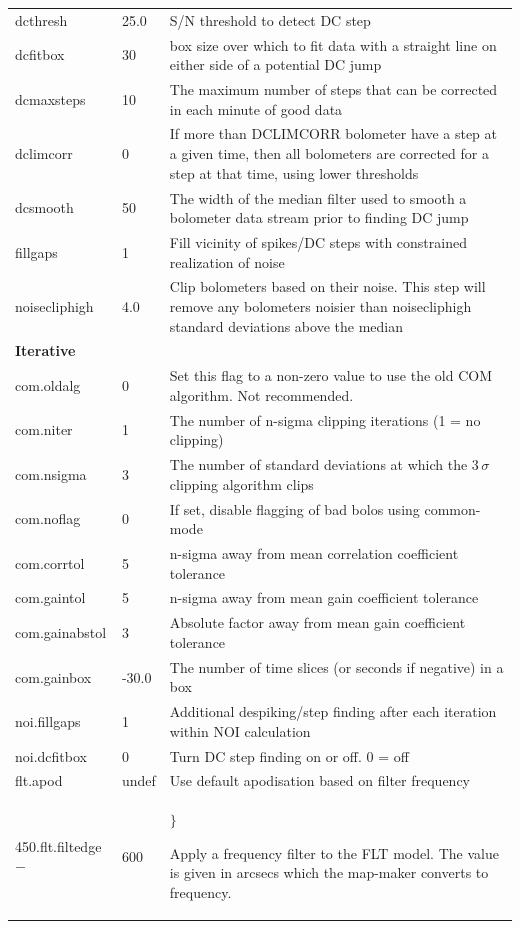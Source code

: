 \documentclass[twoside,11pt]{article}
\newcounter{box}
\renewcommand{\_}{\texttt{\symbol{95}}}
\begin{document}
\begin{table}
\begin{center}
\begin{footnotesize}
\begin{tabular}{|p{2.2cm}|p{1.1cm}|p{11.4cm}|}
dcthresh & 25.0& S/N threshold to detect DC step\\
dcfitbox & 30& box size over which to fit data with a straight line on either side of a potential DC jump\\
dcmaxsteps & 10 &The maximum number of steps that can be corrected in each minute of good data\\
dclimcorr & 0&  If more than DCLIMCORR bolometer have a step at a given time, then all  bolometers are corrected for a step at that time, using lower thresholds\\
dcsmooth & 50& The width of the median filter used to smooth a bolometer data stream prior to finding DC jump\\
fillgaps & 1& Fill vicinity of spikes/DC steps with constrained realization of noise\\
noisecliphigh &4.0& Clip bolometers based on their noise. This step will remove any bolometers noisier than noisecliphigh standard deviations above the median\\
\hline
\multicolumn{3}{|l|}{\textbf{Iterative}}\\
\hline
com.oldalg & 0&Set this flag to a non-zero value to use the old COM algorithm. Not recommended.\\
com.niter & 1&The number of n-sigma clipping iterations (1 = no clipping)\\
com.nsigma & 3&The number of standard deviations at which the 3\,$\sigma$ clipping algorithm clips\\
com.noflag & 0&If set, disable flagging of bad bolos using common-mode\\
com.corr\_tol & 5&n-sigma away from mean correlation coefficient tolerance\\
com.gain\_tol & 5&n-sigma away from mean gain coefficient tolerance\\
com.gain\_abstol & 3&Absolute factor away from mean gain coefficient tolerance\\
com.gain\_box  &-30.0&The number of time slices (or seconds if negative) in a box\\
\hline
noi.fillgaps & 1&Additional despiking/step finding after each iteration within NOI calculation\\
noi.dcfitbox & 0&Turn DC step finding on or off. 0 = off\\
\hline
flt.apod& undef& Use default apodisation based on filter frequency\\
450.flt.filt\_edge$-$&\multirow{2}{*}{600}& \multirow{4}{*}{{\Huge$\rbrace$} \begin{minipage}{10.3cm}Apply a frequency filter to the FLT model. The value is given in arcsecs which the map-maker converts to frequency.\end{minipage} }\\

\end{tabular}
\end{footnotesize}
\end{center}
\end{table}
\end{document}
